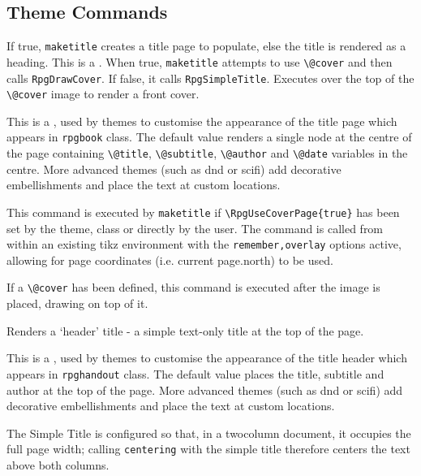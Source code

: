 		\subsection{Theme Commands}
		\begin{macrolist}
				{
					If true, \verb|maketitle| creates a title page to populate, else the title is rendered as a heading.
				}{
				}
				{
					This is a \backendCommand{}. When true, \verb|maketitle| attempts to use \verb|\@cover| and then calls \verb|RpgDrawCover|. If false, it calls \verb|RpgSimpleTitle|.
				}
			\RpgMacro[RpgDrawCover]{\RpgDrawCover,{{}}}
				{
					Executes over the top of the \verb|\@cover| image to render a front cover.
				}{}
				{
					This is a \placeholderCommand{}, used by themes to customise the appearance of the title page which appears in \verb|rpgbook| class. The default value renders a single node at the centre of the page containing \verb|\@title|, \verb|\@subtitle|, \verb|\@author| and \verb|\@date| variables in the centre. More advanced themes (such as dnd or scifi) add decorative embellishments and place the text at custom locations.

					This command is executed by \verb|maketitle| if \verb|\RpgUseCoverPage{true}| has been set by the theme, class or directly by the user. 
					The command is called from within an existing tikz environment with the \verb|remember,overlay| options active, allowing for page coordinates (i.e. current page.north) to be used.

					If a \verb|\@cover| has been defined, this command is executed after the image is placed, drawing on top of it.
				}
			\RpgMacro[RpgSimpleTitle]{\RpgSimpleTitle,{{}}}
				{
					Renders a `header' title - a simple text-only title at the top of the page.
				}{}
				{
					This is a \placeholderCommand{}, used by themes to customise the appearance of the title header which appears in \verb|rpghandout| class. The default value places the title, subtitle and author at the top of the page. More advanced themes (such as dnd or scifi) add decorative embellishments and place the text at custom locations.

					The Simple Title is configured so that, in a twocolumn document, it occupies the full page width; calling \verb|centering| with the simple title therefore centers the text above both columns. 
				}
		\end{macrolist}

